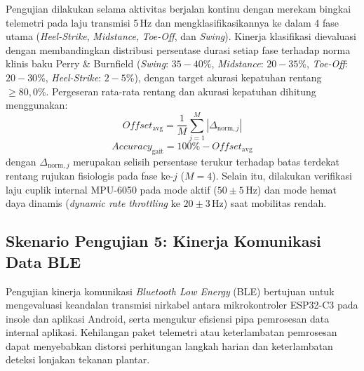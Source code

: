 Pengujian dilakukan selama aktivitas berjalan kontinu dengan merekam bingkai telemetri pada laju transmisi 5\,Hz dan mengklasifikasikannya ke dalam 4 fase utama (\textit{Heel-Strike}, \textit{Midstance}, \textit{Toe-Off}, dan \textit{Swing}). Kinerja klasifikasi dievaluasi dengan membandingkan distribusi persentase durasi setiap fase terhadap norma klinis baku Perry \& Burnfield (\textit{Swing}: $35 - 40\%$, \textit{Midstance}: $20 - 35\%$, \textit{Toe-Off}: $20 - 30\%$, \textit{Heel-Strike}: $2 - 5\%$), dengan target akurasi kepatuhan rentang $\ge 80{,}0\%$. Pergeseran rata-rata rentang dan akurasi kepatuhan dihitung menggunakan:
\begin{equation}
Offset_{\mathrm{avg}} = \frac{1}{M}\sum_{j=1}^{M}\left|\Delta_{\mathrm{norm},j}\right|
\end{equation}
\begin{equation}
Accuracy_{\mathrm{gait}} = 100\% - Offset_{\mathrm{avg}}
\end{equation}
dengan $\Delta_{\mathrm{norm},j}$ merupakan selisih persentase terukur terhadap batas terdekat rentang rujukan fisiologis pada fase ke-$j$ ($M=4$). Selain itu, dilakukan verifikasi laju cuplik internal MPU-6050 pada mode aktif ($50 \pm 5\,\mathrm{Hz}$) dan mode hemat daya dinamis (\textit{dynamic rate throttling} ke $20 \pm 3\,\mathrm{Hz}$) saat mobilitas rendah.

\subsection{Skenario Pengujian 5: Kinerja Komunikasi Data BLE}
\label{subsec:Skenario5}

Pengujian kinerja komunikasi \textit{Bluetooth Low Energy} (BLE) bertujuan untuk mengevaluasi keandalan transmisi nirkabel antara mikrokontroler ESP32-C3 pada insole dan aplikasi Android, serta mengukur efisiensi pipa pemrosesan data internal aplikasi. Kehilangan paket telemetri atau keterlambatan pemrosesan dapat menyebabkan distorsi perhitungan langkah harian dan keterlambatan deteksi lonjakan tekanan plantar.

